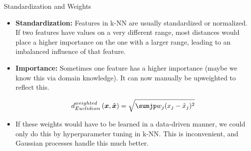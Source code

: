 \begin{vbframe}{Standardization and Weights}


\begin{itemize}
  \item \textbf{Standardization:} Features in k-NN are usually standardized or normalized. If two features have values on a very different range, most distances would place a higher importance on the one with a larger range, leading to an imbalanced influence of that feature.
  \item \textbf{Importance:} Sometimes one feature has a higher importance (maybe we know this via domain knowledge). It can now manually be upweighted to reflect this.

$$d^{weighted}_{Euclidean}\left(\xv, \tilde{\xv}\right) = \sqrt{\sumjp w_{j}(x_j- \tilde{x}_j)^2}$$
  
  \item If these weights would have to be learned in a data-driven manner, 
    we could only do this by hyperparameter tuning in k-NN. This is inconvenient,
    and Gaussian processes handle this much better.
\end{itemize}

\end{vbframe}

